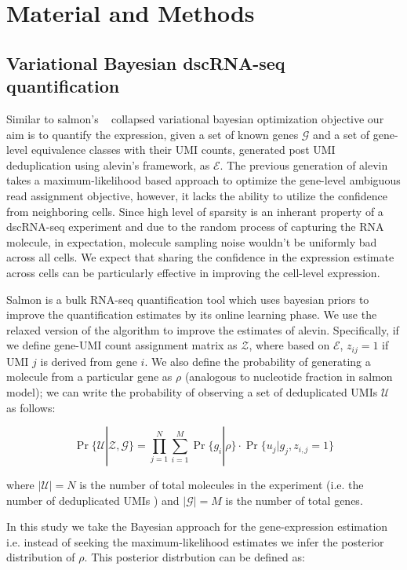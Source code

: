 \section{Material and Methods}
\label{sec:alv2_methods}

\subsection{Variational Bayesian dscRNA-seq quantification}
Similar to salmon's ~\citep{salmon} collapsed variational bayesian optimization 
objective our aim is to quantify the expression, given a set of known genes $\mathcal{G}$ and a set
of gene-level equivalence classes with their UMI counts, generated post UMI deduplication using alevin's 
framework, as $\mathcal{E}$. The previous generation of alevin takes a maximum-likelihood based approach to 
optimize the gene-level ambiguous read assignment objective, however, it lacks the ability to utilize the 
confidence from neighboring cells. Since high level of sparsity is an inherant property of a dscRNA-seq
experiment and due to the random process of capturing the RNA molecule, in expectation, molecule sampling noise wouldn't be uniformly bad across all cells. We expect that sharing the confidence in the expression estimate across cells can be particularly effective in improving the cell-level expression. 

Salmon is a bulk RNA-seq quantification tool which uses bayesian priors to improve the 
quantification estimates by its online learning phase. We use the relaxed version of the algorithm 
to improve the estimates of alevin. Specifically, if we define gene-UMI count 
assignment matrix as $\mathcal{Z}$, where based on $\mathcal{E}$, $z_{ij}=1$ if UMI $j$ is derived from 
gene $i$. We also define the probability of generating a molecule from a particular gene as $\rho$ (analogous to 
nucleotide fraction in salmon model); we can write the probability of observing a set of deduplicated 
UMIs $\mathcal{U}$ as follows:

\begin{equation}
	\Pr\{\mathcal{U} | \mathcal{Z},\mathcal{G}\} = 
	\prod_{j=1}^{N}\sum_{i=1}^{M}\Pr\{ g_i | \rho \} \cdot \Pr\{ u_j | g_j, z_{i,j} = 1 \}
\end{equation}
 
 where $|\mathcal{U}| = N$ is the number of total molecules in the experiment (i.e. the number of 
 deduplicated UMIs ) and $|\mathcal{G}| = M$ is the number of total genes.
 
 In this study we take the Bayesian approach for the gene-expression estimation i.e. instead of 
 seeking the maximum-likelihood estimates we infer the posterior distribution of $\rho$. 
 This posterior distrbution can be defined as:

